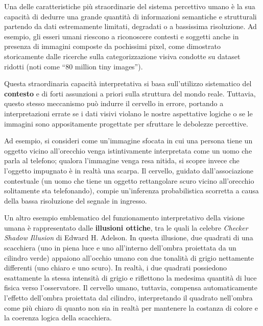 ﻿\documentclass[11pt, a4paper]{article}
\begin{document}

Una delle caratteristiche più straordinarie del sistema percettivo umano è la sua capacità di dedurre una grande quantità di informazioni semantiche e strutturali partendo da dati estremamente limitati, degradati o a bassissima risoluzione. Ad esempio, gli esseri umani riescono a riconoscere contesti e soggetti anche in presenza di immagini composte da pochissimi pixel, come dimostrato storicamente dalle ricerche sulla categorizzazione visiva condotte su dataset ridotti (noti come \enquote{80 million tiny images}).


Questa straordinaria capacità interpretativa si basa sull'utilizzo sistematico del \textbf{contesto} e di forti assunzioni a priori sulla struttura del mondo reale. Tuttavia, questo stesso meccanismo può indurre il cervello in errore, portando a interpretazioni errate se i dati visivi violano le nostre aspettative logiche o se le immagini sono appositamente progettate per sfruttare le debolezze percettive.

Ad esempio, si consideri come un'immagine sfocata in cui una persona tiene un oggetto vicino all'orecchio venga istintivamente interpretata come un uomo che parla al telefono; qualora l'immagine venga resa nitida, si scopre invece che l'oggetto impugnato è in realtà una scarpa. Il cervello, guidato dall'associazione contestuale (un uomo che tiene un oggetto rettangolare scuro vicino all'orecchio solitamente sta telefonando), compie un'inferenza probabilistica scorretta a causa della bassa risoluzione del segnale in ingresso.


Un altro esempio emblematico del funzionamento interpretativo della visione umana è rappresentato dalle \textbf{illusioni ottiche}, tra le quali la celebre \emph{Checker Shadow Illusion} di Edward H. Adelson. In questa illusione, due quadrati di una scacchiera (uno in piena luce e uno all'interno dell'ombra proiettata da un cilindro verde) appaiono all'occhio umano con due tonalità di grigio nettamente differenti (uno chiaro e uno scuro). In realtà, i due quadrati possiedono esattamente la stessa intensità di grigio e riflettono la medesima quantità di luce fisica verso l'osservatore. Il cervello umano, tuttavia, compensa automaticamente l'effetto dell'ombra proiettata dal cilindro, interpretando il quadrato nell'ombra come più chiaro di quanto non sia in realtà per mantenere la costanza di colore e la coerenza logica della scacchiera.
\end{document}
